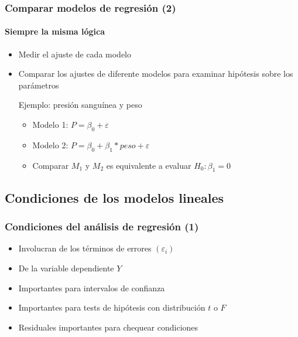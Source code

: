 \documentclass[mathserif]{beamer}
\begin{document}
 
\begin{frame}[label=compregrmod2]
   \frametitle{Comparar modelos de regresi\'on (2)}
   \framesubtitle{Siempre la misma l\'ogica}
    \begin{itemize}
      \item Medir el ajuste de cada modelo
      \item Comparar los ajustes de diferente modelos para examinar hip\'otesis sobre los par\'ametros
      \medskip
      \begin{exampleblock}{Ejemplo: presi\'on sangu\'inea y peso}
         \begin{itemize}
            \item Modelo 1: $P = \beta_0 + \varepsilon$
            \item Modelo 2: $P = \beta_0 + \beta_1*peso + \varepsilon $
            \item Comparar $M_1$ y $M_2$ es equivalente a evaluar $H_0: \beta_1 = 0$
         \end{itemize}
      \end{exampleblock}
   \end{itemize}
\end{frame}%


\subsection[Condiciones]{Condiciones de los modelos lineales}
 
\begin{frame}[label=regrassum1]
   \frametitle{Condiciones del an\'alisis de regresi\'on (1)}
    \begin{itemize}
      \item Involucran de los t\'erminos de errores $(\varepsilon_i)$
      \item De la variable dependiente $Y$
      \item Importantes para intervalos de confianza 
      \item Importantes para tests de hip\'otesis con distribuci\'on $t$ o $F$
      \item Residuales importantes para chequear condiciones
   \end{itemize}
\end{frame}%
\end{document}

